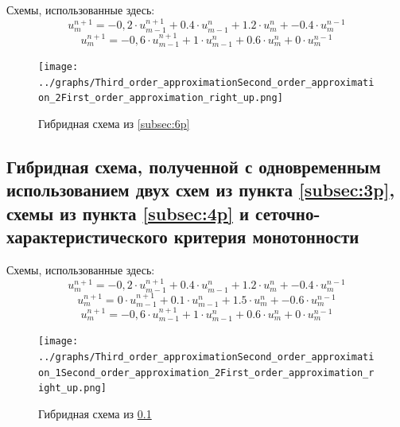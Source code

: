 \documentclass[a4paper, 12pt]{article} %
\begin{document}
\newpage
Схемы, использованные здесь:
$$u^{n+1}_{m} = -0,2 \cdot u^{n+1}_{m-1} + 0.4 \cdot u^{n}_{m-1} + 1.2 \cdot u^{n}_{m} + -0.4 \cdot u^{n-1}_{m}$$
$$u^{n+1}_{m} = -0,6 \cdot u^{n+1}_{m-1} + 1 \cdot u^{n}_{m-1} + 0.6 \cdot u^{n}_{m} + 0 \cdot u^{n-1}_{m}$$
\begin{figure}[h!]
    \centering
    \texttt{[image: ../graphs/Third\_order\_approximationSecond\_order\_approximation\_2First\_order\_approximation\_right\_up.png]}
    \caption{Гибридная схема из \ref{subsec:6p}\\ }
    \label{fig:vac}
\end{figure}

\newpage
\subsection{Гибридная схема, полученной с одновременным использованием двух схем из пункта \ref{subsec:3p}, схемы из пункта \ref{subsec:4p} и сеточно-характеристического критерия монотонности}
\label{subsec:7p}
Схемы, использованные здесь:
$$u^{n+1}_{m} = -0,2 \cdot u^{n+1}_{m-1} + 0.4 \cdot u^{n}_{m-1} + 1.2 \cdot u^{n}_{m} + -0.4 \cdot u^{n-1}_{m}$$
$$u^{n+1}_{m} = 0 \cdot u^{n+1}_{m-1} + 0.1 \cdot u^{n}_{m-1} + 1.5 \cdot u^{n}_{m} + -0.6 \cdot u^{n-1}_{m}$$
$$u^{n+1}_{m} = -0,6 \cdot u^{n+1}_{m-1} + 1 \cdot u^{n}_{m-1} + 0.6 \cdot u^{n}_{m} + 0 \cdot u^{n-1}_{m}$$
\begin{figure}[h!]
    \centering
    \texttt{[image: ../graphs/Third\_order\_approximationSecond\_order\_approximation\_1Second\_order\_approximation\_2First\_order\_approximation\_right\_up.png]}
    \caption{Гибридная схема из \ref{subsec:7p}\\ }
    \label{fig:vac}
\end{figure}
\end{document}

